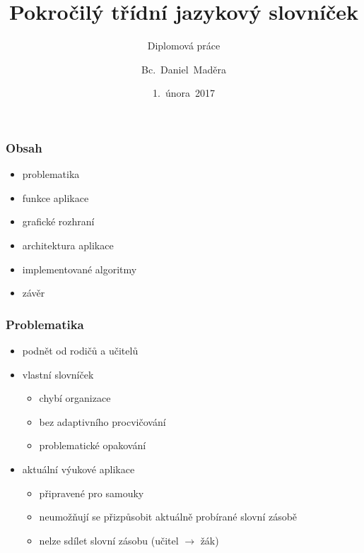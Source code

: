 




\usepackage{palatino}
\usepackage{graphicx}
\usepackage{transparent}


\title[Pokročilý třídní jazykový slovníček]{Pokročilý třídní jazykový slovníček}
\subtitle{Diplomová práce}
\author[Bc.~Daniel~Maděra]{Bc.~Daniel~Maděra}
\date{1.~února~2017}
\newcommand{\TextTitulniStranaPodLinkou}{\tiny
Studentská 2 {\color{FM_TUL} |} 461\,17 Liberec 2 {\color{FM_TUL} |} {daniel.madera@tul.cz} {\color{FM_TUL} |} 
\href{http://www.fm.tul.cz/}{www.fm.tul.cz}}

\renewcommand{\inserttotalframenumber}{\pageref{lastslide}}




\begin{frame}
    \titlepage
\end{frame}

\begin{frame}
    \frametitle{Obsah}
    \begin{itemize}
        \item problematika
        \item funkce aplikace
        \item grafické rozhraní
        \item architektura aplikace
        \item implementované algoritmy
        \item závěr
    \end{itemize}
\end{frame}


\begin{frame}[t]
    \frametitle{Problematika}
    \begin{itemize}[<+->]
        \item podnět od rodičů a učitelů
        \item vlastní slovníček
        \begin{itemize}
            \item chybí organizace
            \item bez adaptivního procvičování
            \item problematické opakování
        \end{itemize}
        \item aktuální výukové aplikace
        \begin{itemize}
            \item připravené pro samouky
            \item neumožňují se přizpůsobit aktuálně probírané slovní zásobě
            \item nelze sdílet slovní zásobu (učitel $\rightarrow$ žák)
        \end{itemize}
    \end{itemize}
\end{frame}

